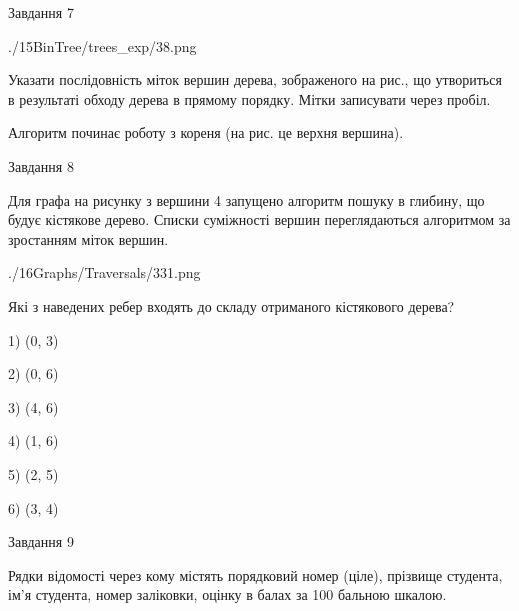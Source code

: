 \documentclass[12pt, ukrainian]{article}
\begin{document}
{\vspace{10mm}\par

\newpage
\begin{minipage}[t]{9.7cm}
               
{\begin{center}Завдання {7}\end{center}}
\vspace{-6mm}

\begin{center}
	{./15BinTree/trees_exp/38.png}
\end{center}
Указати послідовність міток вершин дерева, зображеного на рис., що утвориться в результаті обходу дерева в прямому порядку. Мітки записувати через пробіл.\par Алгоритм починає роботу з кореня (на рис. це верхня вершина).\par

\end{minipage}
\vline \hspace{8mm}
\begin{minipage}[t]{8.0cm}
               
{\begin{center}Завдання {8}\end{center}}
\vspace{-6mm}
Для графа на рисунку з вершини 4 запущено алгоритм пошуку в глибину, що будує кістякове дерево. Списки суміжності вершин переглядаються алгоритмом за зростанням міток вершин.\par
\begin{center}
	{./16Graphs/Traversals/331.png}
\end{center}
\par Які з наведених ребер входять до складу отриманого кістякового дерева?\par
1) (0, 3)\par
2) (0, 6)\par
3) (4, 6)\par
4) (1, 6)\par
5) (2, 5)\par
6) (3, 4)\par
{\vskip 15pt} \par

\end{minipage}

               
{\begin{center}Завдання {9}\end{center}}
\vspace{-6mm}
Рядки відомості через кому містять порядковий номер (ціле), пріз\-ви\-ще студен\-та, ім'я студента, номер заліковки, оцінку в балах за 100 бальною шкалою.

}
\end{document}
